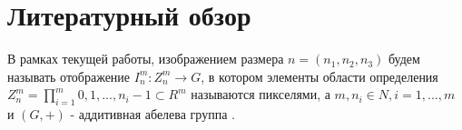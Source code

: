 \section{Литературный обзор}

В рамках текущей работы, изображением размера \(n=(n_1, n_2, n_3)\) будем называть отображение \(I_n^m : Z_n^m \rightarrow G\), в котором элементы области определения \(Z_n^m = \prod \limits_{i=1}^m{0, 1, ..., n_i - 1}\subset R^m\)  называются пикселями, а \(m, n_i \in N, i = 1, ..., m\) и \((G, +)\) - аддитивная абелева группа \cite{NikolaevPhdthesis}.